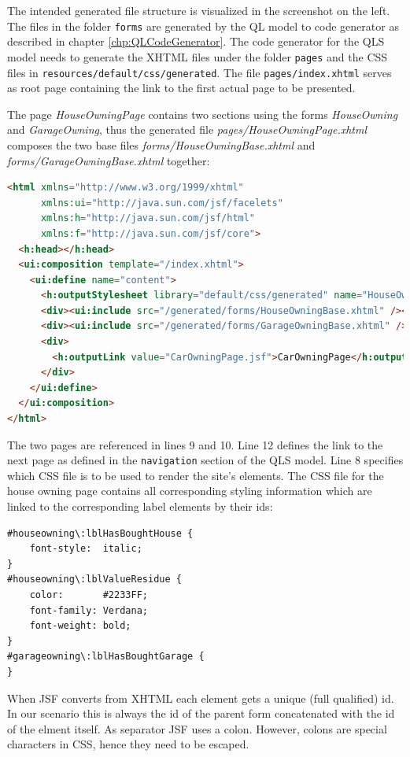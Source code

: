 The intended generated file structure is visualized in the screenshot on the
left. The files in the folder \texttt{forms} are generated by the QL model to
code generator as described in chapter \ref{chp:QLCodeGenerator}. The code
generator for the QLS model needs to generate the XHTML files under the folder
\texttt{pages} and the CSS files in \texttt{resources/default/css/generated}.
The file \texttt{pages/index.xhtml} serves as root page containing the link to
the first actual page to be presented.

The page \emph{HouseOwningPage} contains two sections using the forms \emph{HouseOwning} 
and \emph{GarageOwning}, thus the generated file \emph{pages/HouseOwningPage.xhtml} composes
the two base files \emph{forms/HouseOwningBase.xhtml} and
\emph{forms/GarageOwningBase.xhtml} together:

\begin{lstlisting}[language=HTML]
<html xmlns="http://www.w3.org/1999/xhtml"
      xmlns:ui="http://java.sun.com/jsf/facelets"
      xmlns:h="http://java.sun.com/jsf/html"
      xmlns:f="http://java.sun.com/jsf/core">
  <h:head></h:head>
  <ui:composition template="/index.xhtml">
    <ui:define name="content">
      <h:outputStylesheet library="default/css/generated" name="HouseOwningPage.css"  />
      <div><ui:include src="/generated/forms/HouseOwningBase.xhtml" /></div><p/>
      <div><ui:include src="/generated/forms/GarageOwningBase.xhtml" /></div>
  	  <div>
  	    <h:outputLink value="CarOwningPage.jsf">CarOwningPage</h:outputLink>
  	  </div>
    </ui:define>
  </ui:composition>
</html>
\end{lstlisting}

The two pages are referenced in lines 9 and 10. Line 12 defines the link to the
next page as defined in the \texttt{navigation} section of the QLS model. Line 8
specifies which CSS file is to be used to render the site's elements. The CSS
file for the house owning page contains all corresponding styling information 
which are linked to the corresponding label elements by their ids:

\begin{lstlisting}[language=HTML]
#houseowning\:lblHasBoughtHouse {
	font-style:  italic; 	
}
#houseowning\:lblValueResidue {
	color:       #2233FF; 
	font-family: Verdana; 	
	font-weight: bold; 		
}
#garageowning\:lblHasBoughtGarage {
}
\end{lstlisting}

When JSF converts from XHTML each element gets a unique (full qualified) id. In
our scenario this is always the id of the parent form concatenated with the id
of the elment itself. As separator JSF uses a colon. However, colons are special characters
in CSS, hence they need to be escaped.

